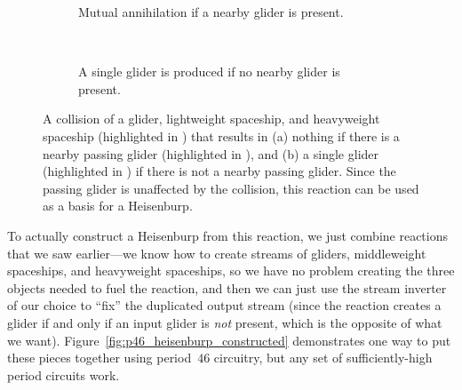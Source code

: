 \begin{figure}[!htb]
	\centering
	\begin{subfigure}{.48\textwidth}
		\centering
		\caption{Mutual annihilation if a nearby glider is present.}
		\label{fig:heisenburp_reaction_p35_0}
	\end{subfigure} \ \ \ \ %
	\begin{subfigure}{.48\textwidth}
		\centering
		\caption{A single glider is produced if no nearby glider is present.}
		\label{fig:heisenburp_reaction_p35_1}
	\end{subfigure}
	\caption{A collision of a glider, lightweight spaceship, and heavyweight spaceship (highlighted in ) that results in (a) nothing if there is a nearby passing glider (highlighted in ), and (b) a single glider (highlighted in ) if there is not a nearby passing glider. Since the passing glider is unaffected by the collision, this reaction can be used as a basis for a Heisenburp.}\label{fig:heisenburp_reaction_p35}
\end{figure}

To actually construct a Heisenburp from this reaction, we just combine reactions that we saw earlier---we know how to create streams of gliders, middleweight spaceships, and heavyweight spaceships, so we have no problem creating the three objects needed to fuel the reaction, and then we can just use the stream inverter of our choice to ``fix'' the duplicated output stream (since the reaction creates a glider if and only if an input glider is \emph{not} present, which is the opposite of what we want). Figure~\ref{fig:p46_heisenburp_constructed} demonstrates one way to put these pieces together using period~$46$ circuitry, but any set of sufficiently-high period circuits work.

